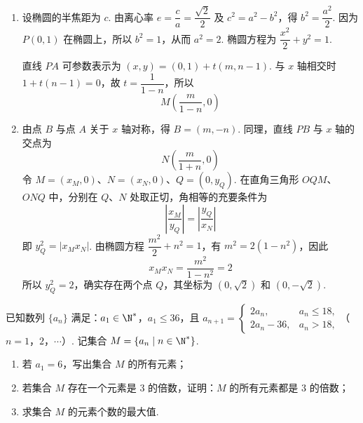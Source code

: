 \begin{solution}
\begin{enumerate}
\item 设椭圆的半焦距为 \(c\). 由离心率 \(e=\dfrac{c}{a}=\dfrac{\sqrt2}{2}\) 及 \(c^2=a^2-b^2\)，得 \(b^2=\dfrac{a^2}{2}\). 因为 \(P(0,1)\) 在椭圆上，所以 \(b^2=1\)，从而 \(a^2=2\). 椭圆方程为 \(\dfrac{x^2}{2}+y^2=1\).

直线 \(PA\) 可参数表示为 \((x,y)=(0,1)+t(m,n-1)\). 与 \(x\) 轴相交时 \(1+t(n-1)=0\)，故 \(t=\dfrac{1}{1-n}\)，所以
\[
M\left(\frac{m}{1-n},0\right)
\]
\item 由点 \(B\) 与点 \(A\) 关于 \(x\) 轴对称，得 \(B=(m,-n)\). 同理，直线 \(PB\) 与 \(x\) 轴的交点为
\[
N\left(\frac{m}{1+n},0\right)
\]
令 \(M=(x_M,0)\)、\(N=(x_N,0)\)、\(Q=(0,y_Q)\). 在直角三角形 \(OQM\)、\(ONQ\) 中，分别在 \(Q\)、\(N\) 处取正切，角相等的充要条件为
\[
\left|\frac{x_M}{y_Q}\right|=\left|\frac{y_Q}{x_N}\right|
\]
即 \(y_Q^2=|x_Mx_N|\). 由椭圆方程 \(\dfrac{m^2}{2}+n^2=1\)，有 \(m^2=2(1-n^2)\)，因此
\[
x_Mx_N=\frac{m^2}{1-n^2}=2
\]
所以 \(y_Q^2=2\)，确实存在两个点 \(Q\)，其坐标为 \((0,\sqrt2)\) 和 \((0,-\sqrt2)\).
\end{enumerate}
\end{solution}

\begin{problem}
已知数列 \(\{a_n\}\) 满足：\(a_1\in\N^*\)，\(a_1\leqslant 36\)，且 \(a_{n+1}=\begin{cases}
2a_n, & a_n\leqslant 18,\\
2a_n-36, & a_n>18,
\end{cases}\)（\(n=1\)，\(2\)，\(\cdots\)）. 记集合 \(M=\{a_n\mid n\in\N^*\}\).

\begin{enumerate}
\item 若 \(a_1=6\)，写出集合 \(M\) 的所有元素；
\item 若集合 \(M\) 存在一个元素是 \(3\) 的倍数，证明：\(M\) 的所有元素都是 \(3\) 的倍数；
\item 求集合 \(M\) 的元素个数的最大值.
\end{enumerate}
\end{problem}


